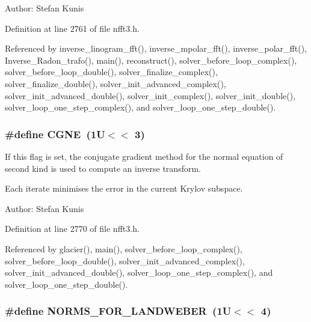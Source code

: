 \begin{Desc}
\item[Author:]Stefan Kunis \end{Desc}


Definition at line 2761 of file nfft3.h.

Referenced by inverse\_\-linogram\_\-fft(), inverse\_\-mpolar\_\-fft(), inverse\_\-polar\_\-fft(), Inverse\_\-Radon\_\-trafo(), main(), reconstruct(), solver\_\-before\_\-loop\_\-complex(), solver\_\-before\_\-loop\_\-double(), solver\_\-finalize\_\-complex(), solver\_\-finalize\_\-double(), solver\_\-init\_\-advanced\_\-complex(), solver\_\-init\_\-advanced\_\-double(), solver\_\-init\_\-complex(), solver\_\-init\_\-double(), solver\_\-loop\_\-one\_\-step\_\-complex(), and solver\_\-loop\_\-one\_\-step\_\-double().\hypertarget{group__solver_gae8290aa6a83fd56699a98cc0a55baf5}{
\subsubsection{\setlength{\rightskip}{0pt plus 5cm}\#define CGNE~(1U$<$$<$ 3)}}
\label{group__solver_gae8290aa6a83fd56699a98cc0a55baf5}


If this flag is set, the conjugate gradient method for the normal equation of second kind is used to compute an inverse transform. 

Each iterate minimises the error in the current Krylov subspace.

\begin{Desc}
\item[Author:]Stefan Kunis \end{Desc}


Definition at line 2770 of file nfft3.h.

Referenced by glacier(), main(), solver\_\-before\_\-loop\_\-complex(), solver\_\-before\_\-loop\_\-double(), solver\_\-init\_\-advanced\_\-complex(), solver\_\-init\_\-advanced\_\-double(), solver\_\-loop\_\-one\_\-step\_\-complex(), and solver\_\-loop\_\-one\_\-step\_\-double().\hypertarget{group__solver_g6be0dda24e7cbd9f3f1d1b299e815973}{
\subsubsection{\setlength{\rightskip}{0pt plus 5cm}\#define NORMS\_\-FOR\_\-LANDWEBER~(1U$<$$<$ 4)}}
\label{group__solver_g6be0dda24e7cbd9f3f1d1b299e815973}


